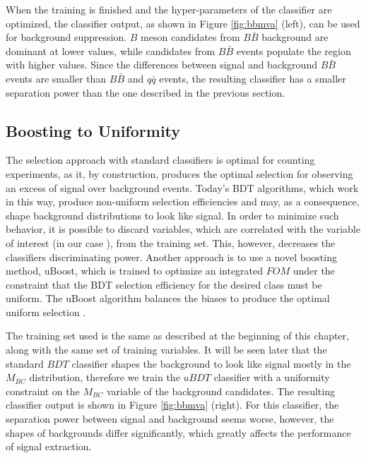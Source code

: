 When the training is finished and the hyper-parameters of the classifier are optimized, the classifier output, as shown in Figure \ref{fig:bbmva} (left), can be used for background suppression. $B$ meson candidates from $B \bar B$ background are dominant at lower values, while candidates from $B \bar B$ events populate the region with higher values. Since the differences between signal and background $B \bar B$ events are smaller than $B \bar B$ and $q \bar q$ events, the resulting classifier has a smaller separation power than the one described in the previous section.

\subsection{Boosting to Uniformity}
The selection approach with standard classifiers is optimal for counting experiments, as it, by construction, produces the optimal selection for observing an excess of signal over background events. Today's BDT algorithms, which work in this way, produce non-uniform selection efficiencies and may, as a consequence, shape background distributions to look like signal. In order to minimize such behavior, it is possible to discard variables, which are correlated with the variable of interest (in our case \vars), from the training set. This, however, decreases the classifiers discriminating power. Another approach is to use a novel boosting method, uBoost, which is trained to optimize an integrated $FOM$ under the constraint that the BDT selection efficiency for the desired class must be uniform. The uBoost algorithm balances the biases to produce the optimal uniform selection \cite{stevens2013uboost}.

The training set used is the same as described at the beginning of this chapter, along with the same set of training variables. It will be seen later that the standard $BDT$ classifier shapes the background to look like signal mostly in the $M_{BC}$ distribution, therefore we train the $uBDT$ classifier with a uniformity constraint on the $M_{BC}$ variable of the background candidates. The resulting classifier output is shown in Figure \ref{fig:bbmva} (right). For this classifier, the separation power between signal and background seems worse, however, the shapes of backgrounds differ significantly, which greatly affects the performance of signal extraction.

